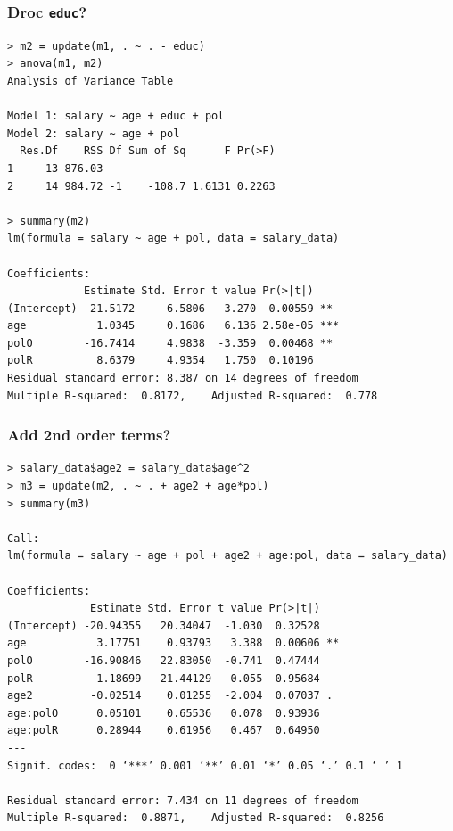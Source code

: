 \documentclass{beamer}
\begin{document}
\begin{frame}[fragile]
\frametitle{Droc \texttt{educ}?}
\begin{footnotesize}
\begin{verbatim}
> m2 = update(m1, . ~ . - educ)
> anova(m1, m2)
Analysis of Variance Table

Model 1: salary ~ age + educ + pol
Model 2: salary ~ age + pol
  Res.Df    RSS Df Sum of Sq      F Pr(>F)
1     13 876.03                           
2     14 984.72 -1    -108.7 1.6131 0.2263

> summary(m2)
lm(formula = salary ~ age + pol, data = salary_data)

Coefficients:
            Estimate Std. Error t value Pr(>|t|)    
(Intercept)  21.5172     6.5806   3.270  0.00559 ** 
age           1.0345     0.1686   6.136 2.58e-05 ***
polO        -16.7414     4.9838  -3.359  0.00468 ** 
polR          8.6379     4.9354   1.750  0.10196    
Residual standard error: 8.387 on 14 degrees of freedom
Multiple R-squared:  0.8172,	Adjusted R-squared:  0.778 
\end{verbatim}
\end{footnotesize}
\end{frame}

\begin{frame}[fragile]
\frametitle{Add 2nd order terms?}
\begin{footnotesize}
\begin{verbatim}
> salary_data$age2 = salary_data$age^2
> m3 = update(m2, . ~ . + age2 + age*pol)
> summary(m3)

Call:
lm(formula = salary ~ age + pol + age2 + age:pol, data = salary_data)

Coefficients:
             Estimate Std. Error t value Pr(>|t|)   
(Intercept) -20.94355   20.34047  -1.030  0.32528   
age           3.17751    0.93793   3.388  0.00606 **
polO        -16.90846   22.83050  -0.741  0.47444   
polR         -1.18699   21.44129  -0.055  0.95684   
age2         -0.02514    0.01255  -2.004  0.07037 . 
age:polO      0.05101    0.65536   0.078  0.93936   
age:polR      0.28944    0.61956   0.467  0.64950   
---
Signif. codes:  0 ‘***’ 0.001 ‘**’ 0.01 ‘*’ 0.05 ‘.’ 0.1 ‘ ’ 1

Residual standard error: 7.434 on 11 degrees of freedom
Multiple R-squared:  0.8871,	Adjusted R-squared:  0.8256 
\end{verbatim}
\end{footnotesize}
\end{frame}
\end{document}
